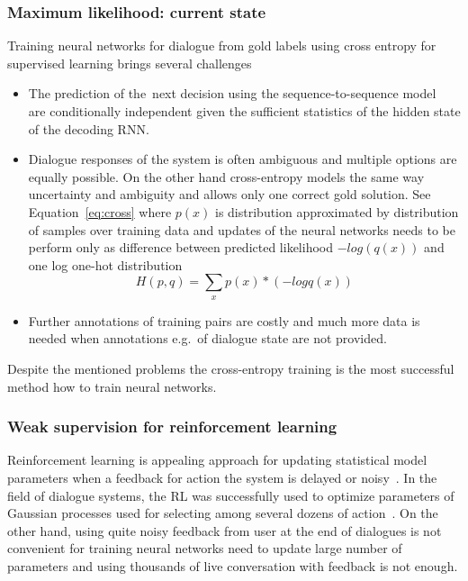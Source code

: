 \documentclass[11pt]{article}
\begin{document}
\subsubsection*{Maximum likelihood: current state}\label{sub:maximum_likelihood}
Training neural networks for dialogue from gold labels using cross entropy for supervised learning brings several challenges
\begin{itemize}
    \item The prediction of the~next decision using the sequence-to-sequence model~\cite{bahdanou,sutskever_sequence_2014} are conditionally independent given the sufficient statistics of the hidden state of the decoding RNN.
    \item Dialogue responses of the system is often ambiguous and multiple options are equally possible.
        On the other hand cross-entropy models the same way uncertainty and ambiguity and allows only one correct gold solution.
        See Equation~\ref{eq:cross} where $p(x)$ is distribution approximated by distribution of samples over training data and updates of the neural networks needs to be perform only as difference between predicted likelihood $-log(q(x))$ and one log one-hot distribution
        \begin{equation}\label{eq:cross}
            H(p, q) = \sum_{x}{p(x) * (- log q(x))}     
        \end{equation}
    \item Further annotations of training pairs are costly and much more data is needed when annotations e.g.\ of dialogue state are not provided.
\end{itemize}
Despite the mentioned problems the cross-entropy training is the most successful method how to train neural networks.

\subsubsection*{Weak supervision for reinforcement learning}\label{sub:batch_rl}
Reinforcement learning is appealing approach for updating statistical model parameters when a feedback for action the system is delayed or noisy~\cite{williams2016end,policy_rec_gradients}.
In the field of dialogue systems, the RL was successfully used to optimize parameters of Gaussian processes used for selecting among several dozens of action~\cite{gasic2011line}.
On the other hand, using quite noisy feedback from user at the end of dialogues is not convenient for training neural networks need to update large number of parameters and using thousands of live conversation with feedback is not enough.
\end{document}
